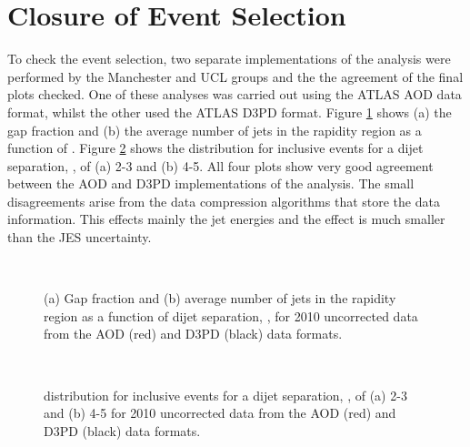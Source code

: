 \section{Closure of Event Selection}
\label{sec:GBJ2:AODD3PD}

To check the event selection, two separate implementations of the analysis were performed by the Manchester and UCL groups and the the agreement of the final plots checked.
One of these analyses was carried out using the ATLAS AOD data format, whilst the other used the ATLAS D3PD format.
Figure \ref{GBJ2:AODD3PD:gap_njet} shows (a) the  gap fraction and (b) the  average number of jets in the rapidity region as a function of \dy{}.
Figure \ref{GBJ2:AODD3PD:dphi} shows the \dphi{} distribution for inclusive events for a dijet separation, \dy{}, of (a) 2-3 and (b) 4-5. 
All four plots show very good agreement between the AOD and D3PD implementations of the analysis.
The small disagreements arise from the data compression algorithms that store the data information.
This effects mainly the jet energies and the effect is much smaller than the JES uncertainty.


\begin{figure}
\centering
\mbox{
              \quad
              \quad
                              }
\caption[]{
(a) Gap fraction and (b) average number of jets in the rapidity region as a function of dijet separation, \dy{}, for 2010 uncorrected data from the AOD (red) and D3PD (black) data formats.
\label{GBJ2:AODD3PD:gap_njet}}
\end{figure}


\begin{figure}
\centering
\mbox{
              \quad
              \quad
                              }
\caption[]{
\dphi{} distribution for inclusive events for a dijet separation, \dy{}, of (a) 2-3 and (b) 4-5 for 2010 uncorrected data from the AOD (red) and D3PD (black) data formats.
\label{GBJ2:AODD3PD:dphi}}
\end{figure}

